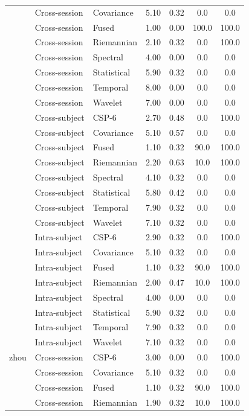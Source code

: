 \begin{table}[t]
\begin{tabular}{lllcccc}
 & Cross-session & Covariance & 5.10 & 0.32 & 0.0 & 0.0 \\
 & Cross-session & Fused & 1.00 & 0.00 & 100.0 & 100.0 \\
 & Cross-session & Riemannian & 2.10 & 0.32 & 0.0 & 100.0 \\
 & Cross-session & Spectral & 4.00 & 0.00 & 0.0 & 0.0 \\
 & Cross-session & Statistical & 5.90 & 0.32 & 0.0 & 0.0 \\
 & Cross-session & Temporal & 8.00 & 0.00 & 0.0 & 0.0 \\
 & Cross-session & Wavelet & 7.00 & 0.00 & 0.0 & 0.0 \\
 & Cross-subject & CSP-6 & 2.70 & 0.48 & 0.0 & 100.0 \\
 & Cross-subject & Covariance & 5.10 & 0.57 & 0.0 & 0.0 \\
 & Cross-subject & Fused & 1.10 & 0.32 & 90.0 & 100.0 \\
 & Cross-subject & Riemannian & 2.20 & 0.63 & 10.0 & 100.0 \\
 & Cross-subject & Spectral & 4.10 & 0.32 & 0.0 & 0.0 \\
 & Cross-subject & Statistical & 5.80 & 0.42 & 0.0 & 0.0 \\
 & Cross-subject & Temporal & 7.90 & 0.32 & 0.0 & 0.0 \\
 & Cross-subject & Wavelet & 7.10 & 0.32 & 0.0 & 0.0 \\
 & Intra-subject & CSP-6 & 2.90 & 0.32 & 0.0 & 100.0 \\
 & Intra-subject & Covariance & 5.10 & 0.32 & 0.0 & 0.0 \\
 & Intra-subject & Fused & 1.10 & 0.32 & 90.0 & 100.0 \\
 & Intra-subject & Riemannian & 2.00 & 0.47 & 10.0 & 100.0 \\
 & Intra-subject & Spectral & 4.00 & 0.00 & 0.0 & 0.0 \\
 & Intra-subject & Statistical & 5.90 & 0.32 & 0.0 & 0.0 \\
 & Intra-subject & Temporal & 7.90 & 0.32 & 0.0 & 0.0 \\
 & Intra-subject & Wavelet & 7.10 & 0.32 & 0.0 & 0.0 \\
\midrule
zhou & Cross-session & CSP-6 & 3.00 & 0.00 & 0.0 & 100.0 \\
 & Cross-session & Covariance & 5.10 & 0.32 & 0.0 & 0.0 \\
 & Cross-session & Fused & 1.10 & 0.32 & 90.0 & 100.0 \\
 & Cross-session & Riemannian & 1.90 & 0.32 & 10.0 & 100.0 \\

\end{tabular}
\end{table}
